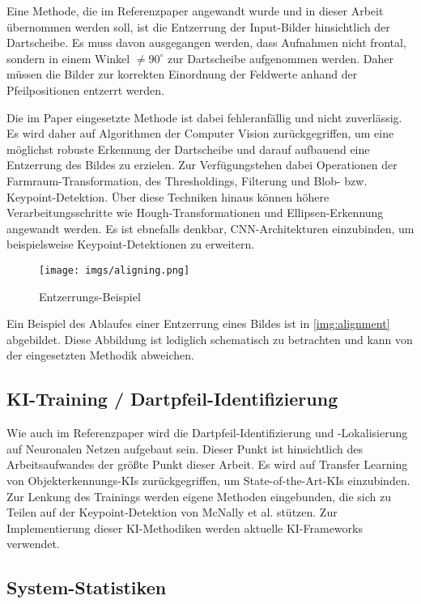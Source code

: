 Eine Methode, die im Referenzpaper angewandt wurde und in dieser Arbeit übernommen werden soll, ist die Entzerrung der Input-Bilder hinsichtlich der Dartscheibe. Es muss davon ausgegangen werden, dass Aufnahmen nicht frontal, sondern in einem Winkel $\neq90^\circ$ zur Dartscheibe aufgenommen werden. Daher müssen die Bilder zur korrekten Einordnung der Feldwerte anhand der Pfeilpositionen entzerrt werden.

Die im Paper eingesetzte Methode ist dabei fehleranfällig und nicht zuverlässig. Es wird daher auf Algorithmen der Computer Vision zurückgegriffen, um eine möglichst robuste Erkennung der Dartscheibe und darauf aufbauend eine Entzerrung des Bildes zu erzielen. Zur Verfügungstehen dabei Operationen der Farmraum-Transformation, des Thresholdings, Filterung und Blob- bzw. Keypoint-Detektion. Über diese Techniken hinaus können höhere Verarbeitungsschritte wie Hough-Transformationen und Ellipsen-Erkennung angewandt werden. Es ist ebnefalls denkbar, CNN-Architekturen einzubinden, um beispielsweise Keypoint-Detektionen zu erweitern.

\begin{figure}
    \centering
    \texttt{[image: imgs/aligning.png]}
    \caption{Entzerrungs-Beispiel}
    \label{img:alignment}
\end{figure}

Ein Beispiel des Ablaufes einer Entzerrung eines Bildes ist in \autoref{img:alignment} abgebildet. Diese Abbildung ist lediglich schematisch zu betrachten und kann von der eingesetzten Methodik abweichen.

\subsection{KI-Training / Dartpfeil-Identifizierung}
\label{sec:methodik:ki}

Wie auch im Referenzpaper wird die Dartpfeil-Identifizierung und -Lokalisierung auf Neuronalen Netzen aufgebaut sein. Dieser Punkt ist hinsichtlich des Arbeitsaufwandes der größte Punkt dieser Arbeit. Es wird auf Transfer Learning von Objekterkennungs-KIs zurückgegriffen, um State-of-the-Art-KIs einzubinden. Zur Lenkung des Trainings werden eigene Methoden eingebunden, die sich zu Teilen auf der Keypoint-Detektion von McNally et al. stützen. Zur Implementierung dieser KI-Methodiken werden aktuelle KI-Frameworks verwendet.

\subsection{System-Statistiken}
\label{sec:methodik:statistiken}

